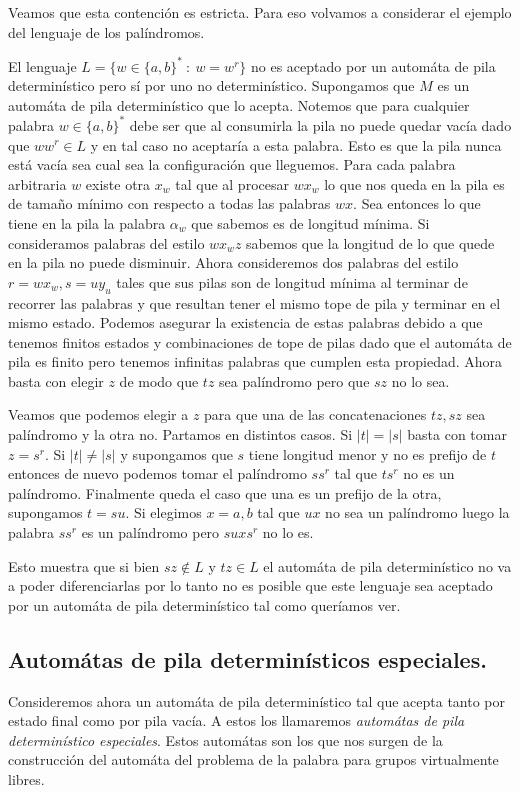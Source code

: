 \documentclass[tesis.tex]{subfiles}
\newcommand{\APD}{automáta de pila determinístico }
\begin{document}
Veamos que esta contención es estricta. Para eso volvamos a considerar el ejemplo del lenguaje de los palíndromos.
\begin{ej}
	El lenguaje $L = \{ w \in \{ a,b \}^*  \ : \ w = w^r \}$ no es aceptado por un \APD pero sí por uno no determinístico. 
	Supongamos que $M$ es un \APD que lo acepta. 
	Notemos que para cualquier palabra $w \in \{ a,b \}^*$ debe ser que al consumirla la pila no puede quedar vacía dado que $ww^r \in L$ y en tal caso no aceptaría a esta palabra. 
	Esto es que la pila nunca está vacía sea cual sea la configuración que lleguemos. 
	Para cada palabra arbitraria $w$ existe otra $x_w$ tal que al procesar $wx_w$ lo que nos queda en la pila es de tamaño mínimo con respecto a todas las palabras $wx$. 
	Sea entonces lo que tiene en la pila la palabra $\alpha_w$ que sabemos es de longitud mínima. Si consideramos palabras del estilo $wx_wz$ sabemos que la longitud de lo que quede en la pila no puede disminuir. 
	Ahora consideremos dos palabras del estilo $r=wx_w, s=uy_u$ tales que sus pilas son de longitud mínima al terminar de recorrer las palabras y que resultan tener el mismo tope de pila y terminar en el mismo estado. 
	Podemos asegurar la existencia de estas palabras debido a que tenemos finitos estados y combinaciones de tope de pilas dado que el automáta de pila es finito pero tenemos infinitas palabras que cumplen esta propiedad. 
	Ahora basta con elegir $z$ de modo que $tz$ sea palíndromo pero que $sz$ no lo sea. 
	
	Veamos que podemos elegir a $z$ para que una de las concatenaciones $tz,sz$ sea palíndromo y la otra no. Partamos en distintos casos. 
	Si $|t|=|s|$ basta con tomar $z=s^r$. 
	Si $|t|\neq |s|$ y supongamos que $s$ tiene longitud menor y no es prefijo de $t$ entonces de nuevo podemos tomar el palíndromo $ss^r$ tal que $ts^r$ no es un palíndromo. 
	Finalmente queda el caso que una es un prefijo de la otra, supongamos $t=su$. 
	Si elegimos $x=a,b$ tal que $ux$ no sea un palíndromo luego la palabra $ss^r$ es un palíndromo pero $suxs^r$ no lo es.
	
	Esto muestra que si bien $sz \notin L$ y $tz \in L$ el \APD no va a poder diferenciarlas por lo tanto no es posible que este lenguaje sea aceptado por un \APD tal como queríamos ver.
	
\end{ej}

\subsection{Automátas de pila determinísticos especiales.} 
Consideremos ahora un \APD tal que acepta tanto por estado final como por pila vacía. A estos los llamaremos \textit{automátas de pila determinístico especiales}.  
Estos automátas son los que nos surgen de la construcción del automáta del problema de la palabra  para grupos virtualmente libres. 
\end{document}
